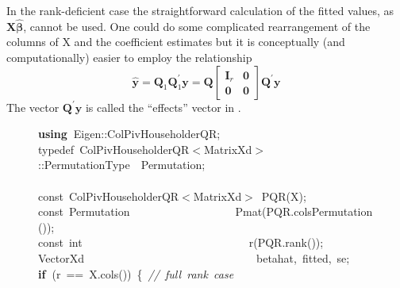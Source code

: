 \documentclass[shortnames,article]{jss}
\newcommand{\hlstd}[1]{\textcolor[rgb]{0,0,0}{#1}}
\newcommand{\hlopt}[1]{\textcolor[rgb]{0,0,0}{#1}}
\newcommand{\hlslc}[1]{\textcolor[rgb]{0.67,0.13,0.13}{\it{#1}}}
\newcommand{\hlkwa}[1]{\textcolor[rgb]{0.61,0.13,0.93}{\bf{#1}}}
\newcommand{\hlkwb}[1]{\textcolor[rgb]{0.13,0.54,0.13}{#1}}
\newcommand{\hlkwc}[1]{\textcolor[rgb]{0,0,1}{#1}}
\newcommand{\hlkwd}[1]{\textcolor[rgb]{0,0,0}{#1}}
\begin{document}
In the rank-deficient case the straightforward calculation of the
fitted values, as $\bm X\widehat{\bm\beta}$, cannot be used.  One
could do some complicated rearrangement of the columns of X and the
coefficient estimates but it is conceptually (and computationally)
easier to employ the relationship
\begin{displaymath}
  \widehat{\bm y} = \bm Q_1\bm Q_1^\prime\bm y=\bm Q
  \begin{bmatrix}
    \bm I_r & \bm 0\\
    \bm 0   & \bm 0
  \end{bmatrix}
  \bm Q^\prime\bm y
\end{displaymath}
The vector $\bm Q^\prime\bm y$ is called the ``effects'' vector in .
\begin{figure}[htb]
    \noindent
    \ttfamily
    \hlstd{}\hlkwa{using\ }\hlstd{Eigen}\hlopt{::}\hlstd{ColPivHouseholderQR}\hlopt{;}\hspace*{\fill}\\
    \hlstd{}\hlkwc{typedef\ }\hlstd{ColPivHouseholderQR}\hlopt{$<$}\hlstd{MatrixXd}\hlopt{$>$::}\hlstd{PermutationType}\hlstd{\ \ }\hlstd{Permutation}\hlopt{;}\hspace*{\fill}\\
    \hlstd{}\hspace*{\fill}\\
    \hlkwb{const\ }\hlstd{ColPivHouseholderQR}\hlopt{$<$}\hlstd{MatrixXd}\hlopt{$>$\ }\hlstd{}\hlkwd{PQR}\hlstd{}\hlopt{(}\hlstd{X}\hlopt{);}\hspace*{\fill}\\
    \hlstd{}\hlkwb{const\ }\hlstd{Permutation}\hlstd{\ \ \ \ \ \ \ \ \ \ \ \ \ \ \ \ \ \ \ }\hlstd{}\hlkwd{Pmat}\hlstd{}\hlopt{(}\hlstd{PQR}\hlopt{.}\hlstd{}\hlkwd{colsPermutation}\hlstd{}\hlopt{());}\hspace*{\fill}\\
    \hlstd{}\hlkwb{const\ int}\hlstd{\ \ \ \ \ \ \ \ \ \ \ \ \ \ \ \ \ \ \ \ \ \ \ \ \ \ \ \ \ \ }\hlkwb{}\hlstd{}\hlkwd{r}\hlstd{}\hlopt{(}\hlstd{PQR}\hlopt{.}\hlstd{}\hlkwd{rank}\hlstd{}\hlopt{());}\hspace*{\fill}\\
    \hlstd{VectorXd}\hlstd{\ \ \ \ \ \ \ \ \ \ \ \ \ \ \ \ \ \ \ \ \ \ \ \ \ \ \ \ \ \ \ }\hlstd{betahat}\hlopt{,\ }\hlstd{fitted}\hlopt{,\ }\hlstd{se}\hlopt{;}\hspace*{\fill}\\
    \hlstd{}\hlkwa{if\ }\hlstd{}\hlopt{(}\hlstd{r\ }\hlopt{==\ }\hlstd{X}\hlopt{.}\hlstd{}\hlkwd{cols}\hlstd{}\hlopt{())\ \{\ }\hlstd{}\hlslc{//\ full\ rank\ case}\hspace*{\fill}\\

\end{figure}
\end{document}
